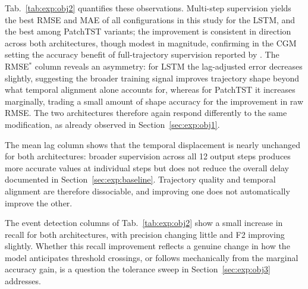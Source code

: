 Tab.~\ref{tab:exp:obj2} quantifies these observations. Multi-step supervision yields the best RMSE and MAE of all configurations in this study for the LSTM, and the best among PatchTST variants; the improvement is consistent in direction across both architectures, though modest in magnitude, confirming in the CGM setting the accuracy benefit of full-trajectory supervision reported by \citet{fox2018multioutput}. The RMSE$^*$ column reveals an asymmetry: for LSTM the lag-adjusted error decreases slightly, suggesting the broader training signal improves trajectory shape beyond what temporal alignment alone accounts for, whereas for PatchTST it increases marginally, trading a small amount of shape accuracy for the improvement in raw RMSE. The two architectures therefore again respond differently to the same modification, as already observed in Section~\ref{sec:exp:obj1}.

The mean lag column shows that the temporal displacement is nearly unchanged for both architectures: broader supervision across all 12 output steps produces more accurate values at individual steps but does not reduce the overall delay documented in Section~\ref{sec:exp:baseline}. Trajectory quality and temporal alignment are therefore dissociable, and improving one does not automatically improve the other.

The event detection columns of Tab.~\ref{tab:exp:obj2} show a small increase in recall for both architectures, with precision changing little and F2 improving slightly. Whether this recall improvement reflects a genuine change in how the model anticipates threshold crossings, or follows mechanically from the marginal accuracy gain, is a question the tolerance sweep in Section~\ref{sec:exp:obj3} addresses.

